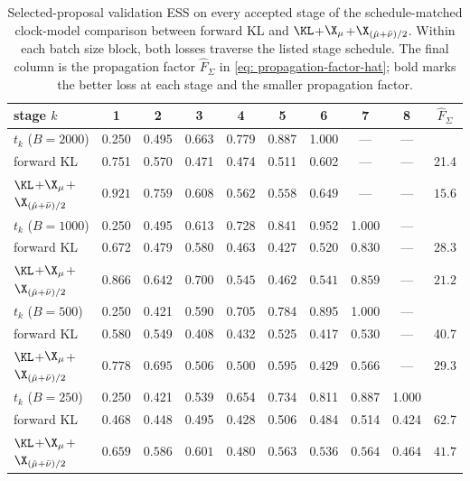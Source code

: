 \documentclass{article}
\begin{document}
\begin{table}[htb]
    \centering
    \begin{tabular}{lccccccccc}
        \toprule
        stage $k$ & 1 & 2 & 3 & 4 & 5 & 6 & 7 & 8 & $\hat F_\Sigma$ \\
        \midrule
        $t_k$ ($B=2000$) & 0.250 & 0.495 & 0.663 & 0.779 & 0.887 & 1.000 & --- & --- & \\
        forward KL & 0.751 & 0.570 & 0.471 & 0.474 & 0.511 & 0.602 & --- & --- & 21.4 \\
        $\KL$+$\X_\mu$+$\X_{(\hat\mu+\bar\nu)/2}$ & $\mathbf{0.921}$ & $\mathbf{0.759}$ & $\mathbf{0.608}$ & $\mathbf{0.562}$ & $\mathbf{0.558}$ & $\mathbf{0.649}$ & --- & --- & $\mathbf{15.6}$ \\
        \midrule
        $t_k$ ($B=1000$) & 0.250 & 0.495 & 0.613 & 0.728 & 0.841 & 0.952 & 1.000 & --- & \\
        forward KL & 0.672 & 0.479 & 0.580 & 0.463 & 0.427 & 0.520 & 0.830 & --- & 28.3 \\
        $\KL$+$\X_\mu$+$\X_{(\hat\mu+\bar\nu)/2}$ & $\mathbf{0.866}$ & $\mathbf{0.642}$ & $\mathbf{0.700}$ & $\mathbf{0.545}$ & $\mathbf{0.462}$ & $\mathbf{0.541}$ & $\mathbf{0.859}$ & --- & $\mathbf{21.2}$ \\
        \midrule
        $t_k$ ($B=500$) & 0.250 & 0.421 & 0.590 & 0.705 & 0.784 & 0.895 & 1.000 & --- & \\
        forward KL & 0.580 & 0.549 & 0.408 & 0.432 & 0.525 & 0.417 & 0.530 & --- & 40.7 \\
        $\KL$+$\X_\mu$+$\X_{(\hat\mu+\bar\nu)/2}$ & $\mathbf{0.778}$ & $\mathbf{0.695}$ & $\mathbf{0.506}$ & $\mathbf{0.500}$ & $\mathbf{0.595}$ & $\mathbf{0.429}$ & $\mathbf{0.566}$ & --- & $\mathbf{29.3}$ \\
        \midrule
        $t_k$ ($B=250$) & 0.250 & 0.421 & 0.539 & 0.654 & 0.734 & 0.811 & 0.887 & 1.000 & \\
        forward KL & 0.468 & 0.448 & 0.495 & 0.428 & 0.506 & 0.484 & 0.514 & 0.424 & 62.7 \\
        $\KL$+$\X_\mu$+$\X_{(\hat\mu+\bar\nu)/2}$ & $\mathbf{0.659}$ & $\mathbf{0.586}$ & $\mathbf{0.601}$ & $\mathbf{0.480}$ & $\mathbf{0.563}$ & $\mathbf{0.536}$ & $\mathbf{0.564}$ & $\mathbf{0.464}$ & $\mathbf{41.7}$ \\
        \bottomrule
    \end{tabular}
    \caption{Selected-proposal validation ESS on every accepted stage of the schedule-matched clock-model comparison between forward KL and $\KL$+$\X_\mu$+$\X_{(\hat\mu+\bar\nu)/2}$. Within each batch size block, both losses traverse the listed stage schedule. The final column is the propagation factor $\hat F_\Sigma$ in \eqref{eq: propagation-factor-hat}; bold marks the better loss at each stage and the smaller propagation factor.}
    \label{tab: clock-summary}
\end{table}
\end{document}
